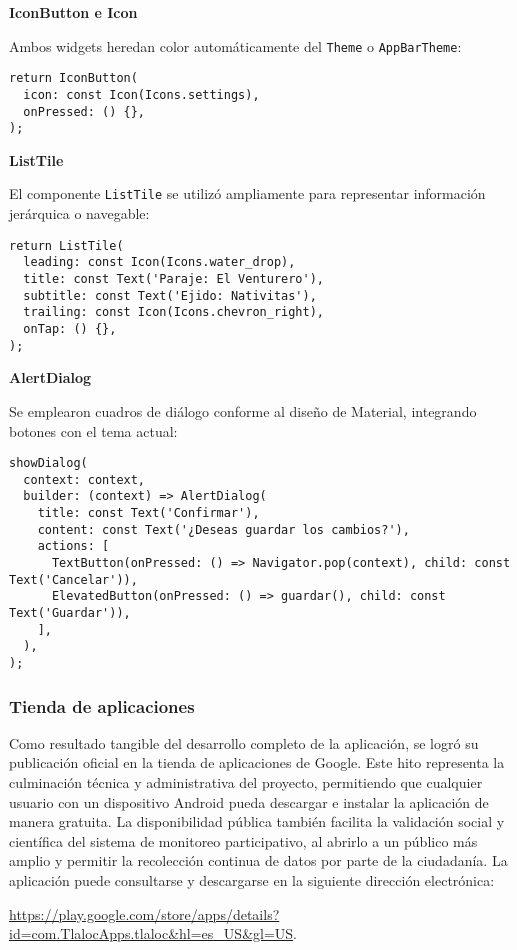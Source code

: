\textbf{IconButton e Icon}

Ambos widgets heredan color automáticamente del \texttt{Theme} o \texttt{AppBarTheme}:

\begin{verbatim}
return IconButton(
  icon: const Icon(Icons.settings),
  onPressed: () {},
);
\end{verbatim}

\textbf{ListTile}

El componente \texttt{ListTile} se utilizó ampliamente para representar información jerárquica o navegable:

\begin{verbatim}
return ListTile(
  leading: const Icon(Icons.water_drop),
  title: const Text('Paraje: El Venturero'),
  subtitle: const Text('Ejido: Nativitas'),
  trailing: const Icon(Icons.chevron_right),
  onTap: () {},
);
\end{verbatim}

\textbf{AlertDialog}

Se emplearon cuadros de diálogo conforme al diseño de Material, integrando botones con el tema actual:

\begin{verbatim}
showDialog(
  context: context,
  builder: (context) => AlertDialog(
    title: const Text('Confirmar'),
    content: const Text('¿Deseas guardar los cambios?'),
    actions: [
      TextButton(onPressed: () => Navigator.pop(context), child: const Text('Cancelar')),
      ElevatedButton(onPressed: () => guardar(), child: const Text('Guardar')),
    ],
  ),
);
\end{verbatim}
 



\subsubsection*{Tienda de aplicaciones} 

Como resultado tangible del desarrollo completo de la aplicación, se logró su publicación oficial en la tienda de aplicaciones de Google. Este hito representa la culminación técnica y administrativa del proyecto, permitiendo que cualquier usuario con un dispositivo Android pueda descargar e instalar la aplicación de manera gratuita. La disponibilidad pública también facilita la validación social y científica del sistema de monitoreo participativo, al abrirlo a un público más amplio y permitir la recolección continua de datos por parte de la ciudadanía. La aplicación puede consultarse y descargarse en la siguiente dirección electrónica:
\begin{center}
   \url{https://play.google.com/store/apps/details?id=com.TlalocApps.tlaloc&hl=es_US&gl=US}.
\end{center}

